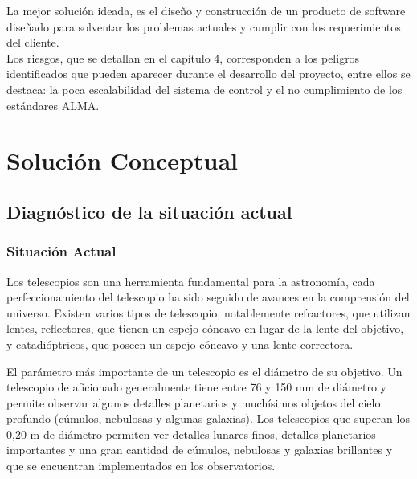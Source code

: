 \documentclass[letterpaper,titlepage,spanish,10pt]{article}
\begin{document}
La mejor soluci\'on ideada, es el dise\~no y construcci\'on de un producto de software dise\~nado 
para solventar los problemas actuales y cumplir con los requerimientos del cliente.\\

Los riesgos, que se detallan en el cap\'itulo 4, corresponden a los peligros identificados 
que pueden aparecer durante el desarrollo del proyecto, entre ellos se destaca: la poca 
escalabilidad del sistema de control y el no cumplimiento de los est\'andares ALMA.




\newpage
\section{Soluci\'on Conceptual} %
\subsection{Diagn\'ostico de la situaci\'on actual}
\subsubsection{Situaci\'on Actual}

Los telescopios son una herramienta fundamental para la astronom\'ia, cada
perfeccionamiento del telescopio ha sido seguido de avances en la comprensi\'on 
del universo.
Existen varios tipos de telescopio, notablemente refractores, que utilizan 
lentes, reflectores, que tienen un espejo c\'oncavo en lugar de la lente del
 objetivo, y catadi\'optricos, que poseen un espejo c\'oncavo y una lente correctora.

El par\'ametro m\'as importante de un telescopio es el di\'ametro de su objetivo. 
Un telescopio de aficionado generalmente tiene entre 76 y 150 mm de di\'ametro y 
permite observar algunos detalles planetarios y much\'isimos objetos del cielo 
profundo (c\'umulos, nebulosas y algunas galaxias). Los telescopios que superan  
los 0,20 m de di\'ametro permiten ver detalles lunares finos, detalles planetarios 
importantes y una gran cantidad de c\'umulos, nebulosas y galaxias brillantes 
y que se encuentran implementados en los observatorios.
\end{document}
